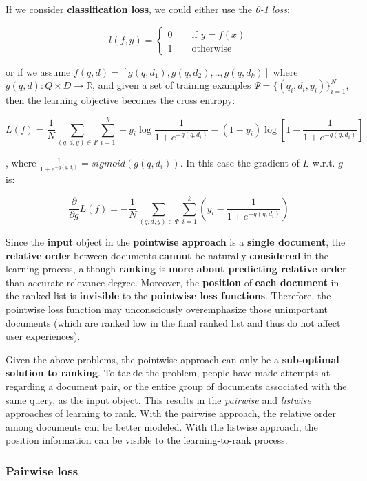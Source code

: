 If we consider \textbf{classification loss}, we could either use the \textit{0-1 loss}:

$$
    l(f,y) = \begin{cases}
	0 \qquad \text{if } y = f(x)\\
	1 \qquad \text{otherwise} 
	\end{cases}
$$

or if we assume $f(q,d) = [g(q,d_1), g(q,d_2), .., g(q,d_k)]$ where $g(q,d): Q \times D \to \mathbb{R}$, and given a set of training examples $\Psi = \{ (q_i, d_i, y_i) \}_{i = 1}^N$, then the learning objective becomes the cross entropy:

$$
L(f) = \frac{1}{N} \sum_{(q,d,y) \in \Psi} \sum_{i = 1}^k -y_i \log \frac{1}{1 + e^{-g(q,d_i)}} - (1-y_i) \log [1 - \frac{1}{1 + e^{-g(q,d_i)}}]
$$

, where $\frac{1}{1 + e^{-g(q,d_i)}} = sigmoid(g(q,d_i))$. In this case the gradient of $L$ w.r.t. $g$ is:

$$
\frac{\partial}{\partial g} L(f) = - \frac{1}{N} \sum_{(q,d,y) \in \Psi} \sum_{i = 1}^k (y_i - \frac{1}{1 + e^{-g(q,d_i)}})
$$

Since the \textbf{input} object in the \textbf{pointwise approach} is a \textbf{single document}, the \textbf{relative orde}r between documents \textbf{cannot} be naturally \textbf{considered} in the learning process, although \textbf{ranking} is \textbf{more about predicting relative order} than accurate relevance degree. Moreover, the \textbf{position} of \textbf{each document} in the ranked list is \textbf{invisible} to the \textbf{pointwise loss functions}. Therefore, the pointwise loss function may unconsciously overemphasize those unimportant documents (which are ranked low in the final ranked list and thus do not affect user experiences). 

Given the above problems, the pointwise approach can only be a \textbf{sub-optimal solution to ranking}. To tackle the problem, people have made attempts at regarding a document pair, or the entire group of documents associated with the same query, as the input object. This results in the \textit{pairwise} and \textit{listwise} approaches of learning to rank. With the pairwise approach, the relative order among documents can be better modeled. With the listwise approach, the position information can be visible to the learning-to-rank process.

\subsubsection{Pairwise loss}

